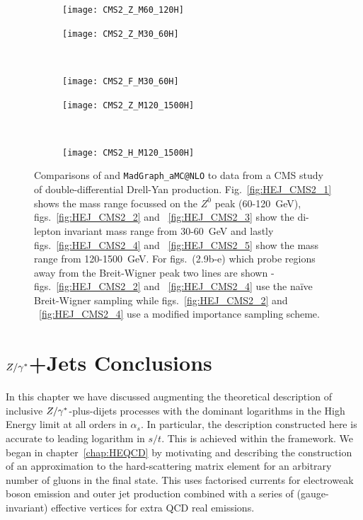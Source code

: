 		\begin{figure}[H]
			\centering
			\begin{subfigure}[b]{0.47\textwidth}
				\texttt{[image: CMS2\_Z\_M60\_120H]}
				\caption{}
				\label{fig:HEJ_CMS2_1}
			\end{subfigure}

			\begin{subfigure}[b]{0.47\textwidth}
				\texttt{[image: CMS2\_Z\_M30\_60H]}
				\caption{}
				\label{fig:HEJ_CMS2_2}
			\end{subfigure}
			~
			\begin{subfigure}[b]{0.47\textwidth}
				\texttt{[image: CMS2\_F\_M30\_60H]}
				\caption{}
				\label{fig:HEJ_CMS2_3}
			\end{subfigure}

			\begin{subfigure}[b]{0.47\textwidth}
				\texttt{[image: CMS2\_Z\_M120\_1500H]}
				\caption{}
				\label{fig:HEJ_CMS2_4}
			\end{subfigure}
			~
			\begin{subfigure}[b]{0.47\textwidth}
				\texttt{[image: CMS2\_H\_M120\_1500H]}
				\caption{}
				\label{fig:HEJ_CMS2_5}
			\end{subfigure}
			\caption{Comparisons of \HEJ and \texttt{MadGraph\_aMC@NLO} to data from a CMS study of double-differential
			Drell-Yan production.  Fig.~\eqref{fig:HEJ_CMS2_1} shows the mass range focussed on the $Z^0$ peak
			(60-120~GeV), figs.~\eqref{fig:HEJ_CMS2_2} and ~\eqref{fig:HEJ_CMS2_3} show the di-lepton invariant
			mass range from 30-60~GeV and lastly figs.~\eqref{fig:HEJ_CMS2_4} and ~\eqref{fig:HEJ_CMS2_5} show
			the mass range from 120-1500~GeV.  For figs.~(2.9b-e) which probe regions away from the Breit-Wigner peak
			two \HEJ lines are shown - figs.~\eqref{fig:HEJ_CMS2_2} and ~\eqref{fig:HEJ_CMS2_4} use the
			na\"ive Breit-Wigner sampling while figs.~\eqref{fig:HEJ_CMS2_2} and ~\eqref{fig:HEJ_CMS2_4}
			use a modified importance sampling scheme.}
		\end{figure}

\section{$Z/\gamma^*$+Jets Conclusions}

	In this chapter we have discussed augmenting the theoretical description of
	inclusive $Z/\gamma^*$-plus-dijets processes with the dominant logarithms in the High
	Energy limit at all orders in $\alpha_s$.  In particular, the description
	constructed here is accurate to leading logarithm in $s/t$.  This is
	achieved within the \hej framework.  We began in
	chapter~\ref{chap:HEQCD} by motivating and describing the construction of an
	approximation to the hard-scattering matrix element for an arbitrary number of
	gluons in the final state.  This uses factorised currents for electroweak boson
	emission and outer jet production combined with a series of (gauge-invariant)
	effective vertices for extra QCD real emissions.

